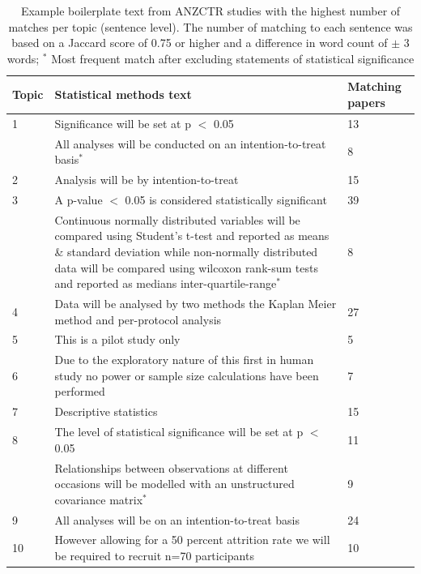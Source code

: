 \documentclass[12pt]{article}
\begin{document}
\begin{table}
\caption{\label{tab:anzctr-example-boilerplate} Example boilerplate text from ANZCTR studies with the highest number of matches per topic (sentence level). The number of matching to each sentence was based on a Jaccard score of 0.75 or higher and a difference in word count of $\pm$ 3 words; $^{*}$ Most frequent match after excluding statements of statistical significance}
\centering
\begin{tabular}[t]{p{}p{}p{}}
\hline
Topic & Statistical methods text & Matching papers\\
\hline
1 & Significance will be set at p $<$ 0.05 & 13\\
 &  All analyses will be conducted on an intention-to-treat basis$^{*}$ & 8\\
\hline
2 & Analysis will be by intention-to-treat & 15\\
\hline
3 & A p-value $<$ 0.05 is considered statistically significant & 39\\
 & Continuous normally distributed variables will be compared using Student's t-test and reported as means \& standard deviation while non-normally distributed data will be compared using wilcoxon rank-sum tests and reported as medians inter-quartile-range$^{*}$ & 8\\
\hline
4 & Data will be analysed by two methods the Kaplan Meier method and per-protocol analysis & 27\\
\hline
5 & This is a pilot study only & 5\\
\hline
6 & Due to the exploratory nature of this first in human study no power or sample size calculations have been performed & 7\\
\hline
7 & Descriptive statistics & 15\\
\hline
8 & The level of statistical significance will be set at p $<$ 0.05 & 11\\
& Relationships between observations at different occasions will be modelled with an unstructured covariance matrix$^{*}$ & 9\\
\hline
9 & All analyses will be on an intention-to-treat basis & 24\\
\hline
10 & However allowing for a 50 percent attrition rate we will be required to recruit n=70 participants & 10\\

\hline
\end{tabular}
\end{table}
\end{document}

